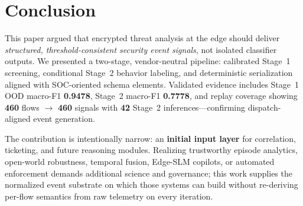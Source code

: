\section{Conclusion}
\label{sec:conclusion}

This paper argued that encrypted threat analysis at the edge should deliver \emph{structured, threshold-consistent security event signals}, not isolated classifier outputs.
We presented a two-stage, vendor-neutral pipeline: calibrated Stage~1 screening, conditional Stage~2 behavior labeling, and deterministic serialization aligned with SOC-oriented schema elements.
Validated evidence includes Stage~1 OOD macro-F1 \textbf{0.9478}, Stage~2 macro-F1 \textbf{0.7778}, and replay coverage showing \textbf{460} flows $\rightarrow$ \textbf{460} signals with \textbf{42} Stage~2 inferences---confirming dispatch-aligned event generation.

The contribution is intentionally narrow: an \textbf{initial input layer} for correlation, ticketing, and future reasoning modules.
Realizing trustworthy episode analytics, open-world robustness, temporal fusion, Edge-SLM copilots, or automated enforcement demands additional science and governance; this work supplies the normalized event substrate on which those systems can build without re-deriving per-flow semantics from raw telemetry on every iteration.
